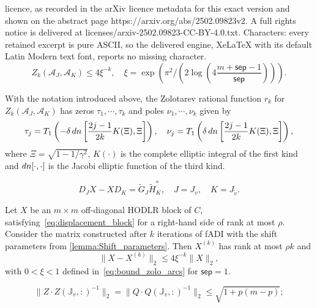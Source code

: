 \documentclass[10pt,a4paper]{amsart}
\newcommand{\sep}{\mathsf{sep}}
\begin{document}
licence, as recorded in the arXiv licence metadata for this exact version and shown on the abstract page https://arxiv.org/abs/2502.09823v2. A full rights notice is delivered at licenses/arxiv-2502.09823-CC-BY-4.0.txt. Characters: every retained excerpt is pure ASCII, so the delivered engine, XeLaTeX with its default Latin Modern text font, reports no missing character.
 \begin{equation}
\label{eq:bound_zolo_arcs}
 Z_k(\mathcal{A}_J, \mathcal{A}_K)  \leq 4 \xi^{-k}, \quad \xi = \exp \left(  \pi^2 / \left( 2 \log \left( 4 \frac{ m+\sep-1}{\sep} \right)  \right) \right). 
\end{equation}

 \begin{lemma}
\label{lemma:Shift_parameters}
With the notation introduced above, the Zolotarev rational function $r_k$ for $Z_k(\mathcal{A}_J, \mathcal{A}_K)$ has  zeros $\tau_1, \cdots, \tau_k$  and  poles $\nu_1, \cdots, \nu_k$ given by
$$ \tau_j = T_1\left( -\delta \, {\rm dn}\left[ \frac{2j - 1}{2k} K(\Xi), \Xi \right] \right), \quad \nu_j = T_1\left( \delta \, {\rm dn}\left[ \frac{2j - 1}{2k} K(\Xi), \Xi \right] \right), $$
where $\Xi = \sqrt{1-1/\gamma^2}$, $K(\cdot)$ is the complete elliptic integral of the first kind and ${\rm dn}[\cdot, \cdot]$ is the Jacobi elliptic function of the third kind.
\end{lemma}

\begin{equation} 
\label{eq:displacement_block}
D_JX - XD_K = \widetilde{G}_J\widetilde{H}_K^*, \quad J = J_v, \quad K = J_{\widetilde v}.
\end{equation} 

\begin{corollary}
\label{corr:ADIbounds}
Let $X$ be an $m\times m$ off-diagonal HODLR block of $C$, satisfying~\eqref{eq:displacement_block} for a right-hand side of rank at most $\rho$.
Consider the matrix  constructed after $k$ iterations of fADI with the 
shift parameters  from \cref{lemma:Shift_parameters}.
Then $X^{(k)}$ has rank at most $\rho k$ and
$$ \|X-X^{(k)}\|_2 \leq 4 \xi^{-k} \|X\|_2,$$
with $0 < \xi <1$ defined in~\eqref{eq:bound_zolo_arcs} for $\sep = 1$.
\end{corollary} 

\begin{equation} \label{eq:osinsky}
 \|Z \cdot Z(\mathbb J_v,:)^{-1} \|_2 = 
 \|Q \cdot Q(\mathbb J_v,:)^{-1} \|_2 \le \sqrt{1+p(m-p)};
\end{equation}
\end{document}
